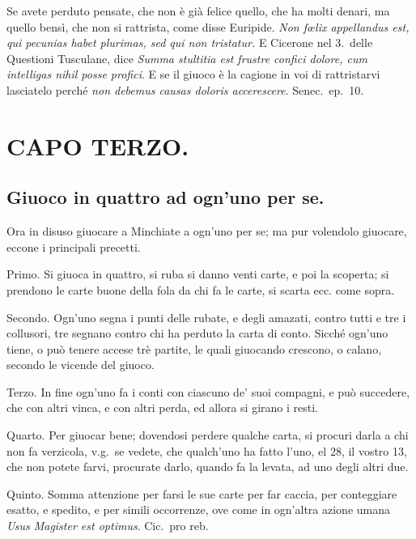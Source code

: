 \documentclass[11pt,a6paper]{article}
\begin{document}
Se avete perduto pensate, che non è già
felice quello, che ha molti denari, ma quello
bensì, che non si rattrista, come disse
Euripide. \textit{Non fœlix appellandus est, qui pecunias
habet plurimas, sed qui non tristatur.}
E Cicerone nel 3.\ delle Questioni Tusculane,
dice \textit{Summa stultitia est frustre confici dolore,
 cum intelligas nihil posse profici}. E se il giuoco
è la cagione in voi di rattristarvi lasciatelo
perché \textit{non debemus causas doloris
  accerescere}. Senec.\ ep.\ 10.


\section{CAPO TERZO.}

\subsection{Giuoco in quattro ad ogn'uno per se.}

Ora in disuso giuocare a Minchiate a ogn'uno per se; ma pur volendolo giuocare,
eccone i principali precetti.

Primo. Si giuoca in quattro, si ruba si
danno venti carte, e poi la scoperta; si
prendono le carte buone della fola da chi fa le
carte, si scarta ecc. come sopra.

Secondo. Ogn'uno segna i punti delle
rubate, e degli amazati, contro tutti e tre i
collusori, tre segnano contro chi ha perduto
la carta di conto. Sicché ogn'uno tiene, o
può tenere accese trè partite, le quali
giuocando crescono, o calano, secondo le
vicende del giuoco.

Terzo. In fine ogn'uno fa i conti con
ciascuno de' suoi compagni, e può
succedere, che con altri vinca, e con altri perda, ed
allora si girano i resti.

Quarto. Per giuocar bene; dovendosi
perdere qualche carta, si procuri darla a chi
non fa verzicola, v.g.\ se vedete, che
qualch'uno ha fatto l'uno, el 28, il vostro 13, che
non potete farvi, procurate darlo, quando
fa la levata, ad uno degli altri due.

Quinto. Somma attenzione per farsi le
sue carte per far caccia, per conteggiare
esatto, e spedito, e per simili occorrenze, ove
come in ogn'altra azione umana \textit{Usus Magister est optimus}. Cic.\ pro reb.
\end{document}

